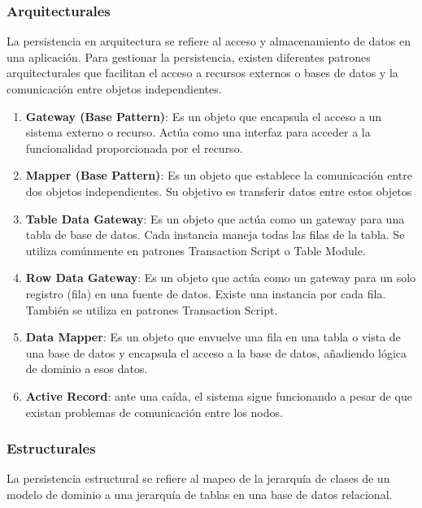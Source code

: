 \documentclass{article}
\begin{document}
		\subsubsection{Arquitecturales}
		La persistencia en arquitectura se refiere al acceso y almacenamiento de datos en una aplicación. Para gestionar la persistencia, existen diferentes patrones arquitecturales que facilitan el acceso a recursos externos o bases de datos y la comunicación entre objetos independientes.
		\begin{enumerate}
			\item {\textbf{Gateway (Base Pattern)}}: Es un objeto que encapsula el acceso a un sistema externo o recurso. Actúa como una interfaz para acceder a la funcionalidad proporcionada por el recurso.
			
			
			
			\item {\textbf{Mapper (Base Pattern)}}:  Es un objeto que establece la comunicación entre dos objetos independientes. Su objetivo es transferir datos entre estos objetos
			
			\item {\textbf{Table Data Gateway}}: Es un objeto que actúa como un gateway para una tabla de base de datos. Cada instancia maneja todas las filas de la tabla. Se utiliza comúnmente en patrones Transaction Script o Table Module.
			
			\item {\textbf{Row Data Gateway}}: Es un objeto que actúa como un gateway para un solo registro (fila) en una fuente de datos. Existe una instancia por cada fila. También se utiliza en patrones Transaction Script.
			
			\item {\textbf{Data Mapper}}: Es un objeto que envuelve una fila en una tabla o vista de una base de datos y encapsula el acceso a la base de datos, añadiendo lógica de dominio a esos datos. 
			
			
			
			\item {\textbf{Active Record}}: ante una caída, el sistema sigue funcionando a pesar de que existan problemas de comunicación entre los nodos.
		\end{enumerate}
		
		
		\subsubsection{Estructurales}
		La persistencia estructural se refiere al mapeo de la jerarquía de clases de un modelo de dominio a una jerarquía de tablas en una base de datos relacional.
\end{document}
